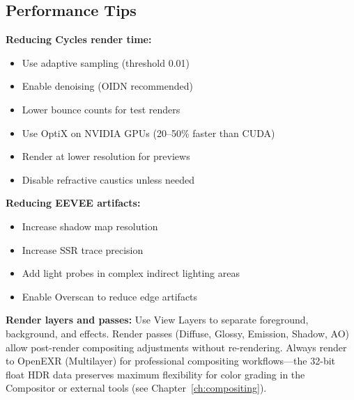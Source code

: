 \subsection{Performance Tips}

\begin{tipbox}
\textbf{Reducing Cycles render time:}
\begin{itemize}[leftmargin=1.5em]
  \item Use adaptive sampling (threshold 0.01)
  \item Enable denoising (OIDN recommended)
  \item Lower bounce counts for test renders
  \item Use OptiX on NVIDIA GPUs (20--50\% faster than CUDA)
  \item Render at lower resolution for previews
  \item Disable refractive caustics unless needed
\end{itemize}
\end{tipbox}

\begin{tipbox}
\textbf{Reducing EEVEE artifacts:}
\begin{itemize}[leftmargin=1.5em]
  \item Increase shadow map resolution
  \item Increase SSR trace precision
  \item Add light probes in complex indirect lighting areas
  \item Enable Overscan to reduce edge artifacts
\end{itemize}
\end{tipbox}

\begin{tipbox}
\textbf{Render layers and passes:} Use View Layers to separate
foreground, background, and effects. Render passes (Diffuse,
Glossy, Emission, Shadow, AO) allow post-render compositing
adjustments without re-rendering. Always render to OpenEXR
(Multilayer) for professional compositing workflows---the 32-bit
float HDR data preserves maximum flexibility for color grading in
the Compositor or external tools (see
Chapter~\ref{ch:compositing}).
\end{tipbox}

